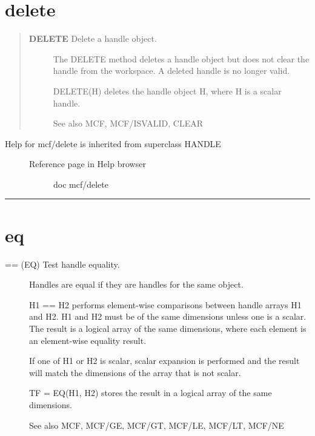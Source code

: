 \documentclass[letterpaper,10pt,english]{sphinxmanual}
\begin{document}
\section{delete}
\label{classes/utils/@mcf/mcf:id8}\label{classes/utils/@mcf/mcf:delete}\begin{quote}
\begin{description}
\item[{\textbf{DELETE}   Delete a handle object.}] \leavevmode
The DELETE method deletes a handle object but does not clear the handle
from the workspace.  A deleted handle is no longer valid.

DELETE(H) deletes the handle object H, where H is a scalar handle.

See also MCF, MCF/ISVALID, CLEAR

\end{description}
\end{quote}
\begin{description}
\item[{Help for mcf/delete is inherited from superclass HANDLE}] \leavevmode\begin{description}
\item[{Reference page in Help browser}] \leavevmode
doc mcf/delete

\end{description}

\end{description}


\bigskip\hrule{}\bigskip



\section{eq}
\label{classes/utils/@mcf/mcf:eq}\label{classes/utils/@mcf/mcf:id9}\begin{description}
\item[{== (EQ)   Test handle equality.}] \leavevmode
Handles are equal if they are handles for the same object.

H1 == H2 performs element-wise comparisons between handle arrays H1 and
H2.  H1 and H2 must be of the same dimensions unless one is a scalar.
The result is a logical array of the same dimensions, where each
element is an element-wise equality result.

If one of H1 or H2 is scalar, scalar expansion is performed and the
result will match the dimensions of the array that is not scalar.

TF = EQ(H1, H2) stores the result in a logical array of the same
dimensions.

See also MCF, MCF/GE, MCF/GT, MCF/LE, MCF/LT, MCF/NE

\end{description}
\end{document}
